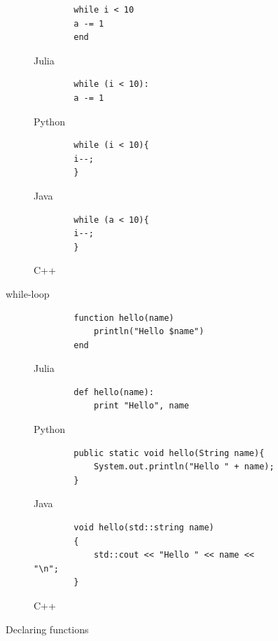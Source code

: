 \documentclass[a4paper,11pt]{article}
\begin{document}
\begin{figure}[H]
	\centering
	\begin{subfigure}[b]{0.7\textwidth}
		\centering
		\begin{lstlisting}
		while i < 10
		a -= 1
		end
		\end{lstlisting}
		\caption{Julia}
	\end{subfigure}
	\begin{subfigure}[b]{0.7\textwidth}
		\centering
		\begin{lstlisting}
		while (i < 10):
		a -= 1
		\end{lstlisting}
		\caption{Python}
	\end{subfigure}	
	\begin{subfigure}[b]{0.7\textwidth}
		\centering
		\begin{lstlisting}
		while (i < 10){
		i--;
		}
		\end{lstlisting}
		\caption{Java}
	\end{subfigure}
	\begin{subfigure}[b]{0.7\textwidth}
		\centering
		\begin{lstlisting}
		while (a < 10){
		i--;
		}
		\end{lstlisting}
		\caption{C++}
	\end{subfigure}
	\caption{while-loop}
	\label{whileloop}
\end{figure}

\begin{figure}[H]
	\centering
	\begin{subfigure}[b]{0.7\textwidth}
		\centering
		\begin{lstlisting}
		function hello(name)
			println("Hello $name")
		end
		\end{lstlisting}
		\caption{Julia}
	\end{subfigure}
	\begin{subfigure}[b]{0.7\textwidth}
		\centering
		\begin{lstlisting}
		def hello(name):
			print "Hello", name
		\end{lstlisting}
		\caption{Python}
	\end{subfigure}	
	\begin{subfigure}[b]{0.7\textwidth}
		\centering
		\begin{lstlisting}
		public static void hello(String name){
			System.out.println("Hello " + name);
		}
		\end{lstlisting}
		\caption{Java}
	\end{subfigure}
	\begin{subfigure}[b]{0.7\textwidth}
		\centering
		\begin{lstlisting}
		void hello(std::string name)
		{
			std::cout << "Hello " << name << "\n";
		}
		\end{lstlisting}
		\caption{C++}
	\end{subfigure}
	\caption{Declaring functions}
	\label{function}
\end{figure}
\end{document}
